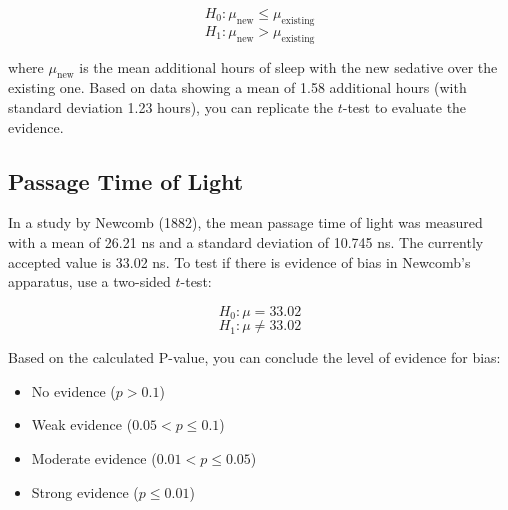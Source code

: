 \documentclass{article}
\begin{document}
\[
H_0: \mu_{\text{new}} \leq \mu_{\text{existing}}
\]
\[
H_1: \mu_{\text{new}} > \mu_{\text{existing}}
\]

where \(\mu_{\text{new}}\) is the mean additional hours of sleep with the new sedative over the existing one. Based on data showing a mean of 1.58 additional hours (with standard deviation 1.23 hours), you can replicate the \( t \)-test to evaluate the evidence. 

\subsection*{Passage Time of Light}

In a study by Newcomb (1882), the mean passage time of light was measured with a mean of 26.21 ns and a standard deviation of 10.745 ns. The currently accepted value is 33.02 ns. To test if there is evidence of bias in Newcomb’s apparatus, use a two-sided \( t \)-test:

\[
H_0: \mu = 33.02
\]
\[
H_1: \mu \neq 33.02
\]

Based on the calculated P-value, you can conclude the level of evidence for bias:

\begin{itemize}
    \item No evidence (\( p > 0.1 \))
    \item Weak evidence (\(0.05 < p \leq 0.1\))
    \item Moderate evidence (\(0.01 < p \leq 0.05\))
    \item Strong evidence (\( p \leq 0.01\))
\end{itemize}
\end{document}
